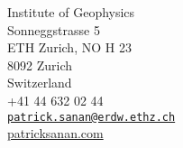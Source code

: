 {\small Institute of  Geophysics\\ Sonneggstrasse 5\\ ETH Zurich, NO H 23\\ 8092 Zurich\\ Switzerland}\\
{\small +41 44 632 02 44} \\
\vspace{5pt}
{\tt \href{mailto:patrick.sanan@gmail.com}{patrick.sanan@erdw.ethz.ch}}\\
\vspace{5pt}
{\href{http://www.patricksanan.com}{patricksanan.com}}\\
